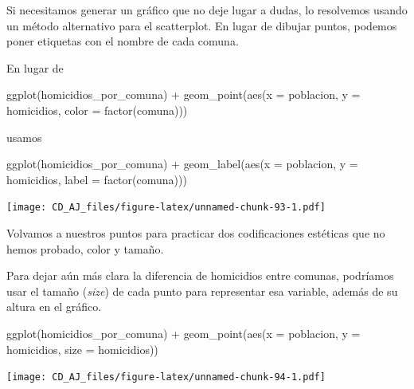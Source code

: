 \documentclass[
]{book}
\newenvironment{Shaded}{\begin{snugshade}}{\end{snugshade}}
\newcommand{\AttributeTok}[1]{\textcolor[rgb]{0.77,0.63,0.00}{#1}}
\newcommand{\FunctionTok}[1]{\textcolor[rgb]{0.00,0.00,0.00}{#1}}
\newcommand{\NormalTok}[1]{#1}
\newcommand{\SpecialCharTok}[1]{\textcolor[rgb]{0.00,0.00,0.00}{#1}}
\begin{document}
Si necesitamos generar un gráfico que no deje lugar a dudas, lo resolvemos usando un método alternativo para el scatterplot. En lugar de dibujar puntos, podemos poner etiquetas con el nombre de cada comuna.

En lugar de

\begin{Shaded}
\begin{Highlighting}[]
\FunctionTok{ggplot}\NormalTok{(homicidios\_por\_comuna) }\SpecialCharTok{+} 
    \FunctionTok{geom\_point}\NormalTok{(}\FunctionTok{aes}\NormalTok{(}\AttributeTok{x =}\NormalTok{ poblacion, }\AttributeTok{y =}\NormalTok{ homicidios, }\AttributeTok{color =} \FunctionTok{factor}\NormalTok{(comuna)))}
\end{Highlighting}
\end{Shaded}

usamos

\begin{Shaded}
\begin{Highlighting}[]
\FunctionTok{ggplot}\NormalTok{(homicidios\_por\_comuna) }\SpecialCharTok{+} 
    \FunctionTok{geom\_label}\NormalTok{(}\FunctionTok{aes}\NormalTok{(}\AttributeTok{x =}\NormalTok{ poblacion, }\AttributeTok{y =}\NormalTok{ homicidios, }\AttributeTok{label =} \FunctionTok{factor}\NormalTok{(comuna)))}
\end{Highlighting}
\end{Shaded}

\texttt{[image: CD\_AJ\_files/figure-latex/unnamed-chunk-93-1.pdf]}

Volvamos a nuestros puntos para practicar dos codificaciones estéticas que no hemos probado, color y tamaño.

Para dejar aún más clara la diferencia de homicidios entre comunas, podríamos usar el tamaño (\emph{size}) de cada punto para representar esa variable, además de su altura en el gráfico.

\begin{Shaded}
\begin{Highlighting}[]
\FunctionTok{ggplot}\NormalTok{(homicidios\_por\_comuna) }\SpecialCharTok{+} 
    \FunctionTok{geom\_point}\NormalTok{(}\FunctionTok{aes}\NormalTok{(}\AttributeTok{x =}\NormalTok{ poblacion, }\AttributeTok{y =}\NormalTok{ homicidios, }\AttributeTok{size =}\NormalTok{ homicidios))}
\end{Highlighting}
\end{Shaded}

\texttt{[image: CD\_AJ\_files/figure-latex/unnamed-chunk-94-1.pdf]}
\end{document}
